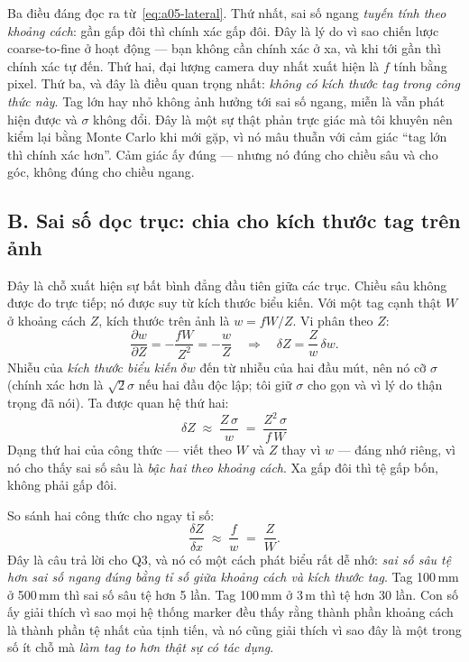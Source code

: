 \documentclass[../../marker.tex]{subfiles}
\begin{document}
Ba điều đáng đọc ra từ~\eqref{eq:a05-lateral}. Thứ nhất, sai số ngang \emph{tuyến tính theo khoảng cách}: gần gấp đôi thì chính xác gấp đôi. Đây là lý do vì sao chiến lược coarse-to-fine ở  hoạt động --- bạn không cần chính xác ở xa, và khi tới gần thì chính xác tự đến. Thứ hai, đại lượng camera duy nhất xuất hiện là \(f\) tính bằng pixel. Thứ ba, và đây là điều quan trọng nhất: \emph{không có kích thước tag trong công thức này}. Tag lớn hay nhỏ không ảnh hưởng tới sai số ngang, miễn là vẫn phát hiện được và \(\sigma\) không đổi. Đây là một sự thật phản trực giác mà tôi khuyên nên kiểm lại bằng Monte Carlo khi mới gặp, vì nó mâu thuẫn với cảm giác ``tag lớn thì chính xác hơn''. Cảm giác ấy đúng --- nhưng nó đúng cho chiều sâu và cho góc, không đúng cho chiều ngang.

\subsection{B. Sai số dọc trục: chia cho kích thước tag trên ảnh}

Đây là chỗ xuất hiện sự bất bình đẳng đầu tiên giữa các trục. Chiều sâu không được đo trực tiếp; nó được suy từ kích thước biểu kiến. Với một tag cạnh thật \(W\) ở khoảng cách \(Z\), kích thước trên ảnh là \(w = fW/Z\). Vi phân theo \(Z\):
\[
\frac{\partial w}{\partial Z} = -\frac{fW}{Z^2} = -\frac{w}{Z}
\quad\Longrightarrow\quad
\delta Z = \frac{Z}{w}\,\delta w .
\]
Nhiễu của \emph{kích thước biểu kiến} \(\delta w\) đến từ nhiễu của hai đầu mút, nên nó cỡ \(\sigma\) (chính xác hơn là \(\sqrt{2}\sigma\) nếu hai đầu độc lập; tôi giữ \(\sigma\) cho gọn và vì lý do thận trọng đã nói). Ta được quan hệ thứ hai:
\begin{equation}
\boxed{\;\delta Z \;\approx\; \frac{Z\,\sigma}{w} \;=\; \frac{Z^2\,\sigma}{f\,W}\;}
\label{eq:a05-depth}
\end{equation}
Dạng thứ hai của công thức --- viết theo \(W\) và \(Z\) thay vì \(w\) --- đáng nhớ riêng, vì nó cho thấy sai số sâu là \emph{bậc hai theo khoảng cách}. Xa gấp đôi thì tệ gấp bốn, không phải gấp đôi.

So sánh hai công thức cho ngay tỉ số:
\[
\frac{\delta Z}{\delta x} \;\approx\; \frac{f}{w} \;=\; \frac{Z}{W}.
\]
Đây là câu trả lời cho Q3, và nó có một cách phát biểu rất dễ nhớ: \emph{sai số sâu tệ hơn sai số ngang đúng bằng tỉ số giữa khoảng cách và kích thước tag}. Tag 100\,mm ở 500\,mm thì sai số sâu tệ hơn 5 lần. Tag 100\,mm ở 3\,m thì tệ hơn 30 lần. Con số ấy giải thích vì sao mọi hệ thống marker đều thấy rằng thành phần khoảng cách là thành phần tệ nhất của tịnh tiến, và nó cũng giải thích vì sao đây là một trong số ít chỗ mà \emph{làm tag to hơn thật sự có tác dụng}.
\end{document}

